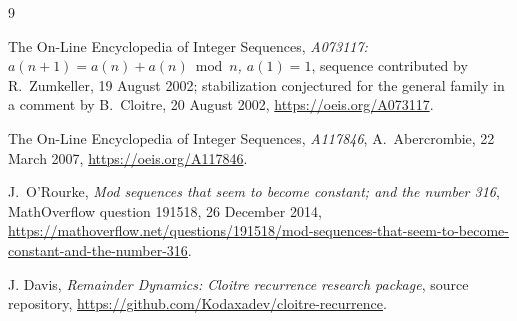 \documentclass[11pt]{article}
\theoremstyle{definition}
\theoremstyle{remark}
\begin{document}
\begin{thebibliography}{9}

The On-Line Encyclopedia of Integer Sequences,
\emph{A073117: $a(n+1)=a(n)+a(n)\bmod n$, $a(1)=1$},
sequence contributed by R.~Zumkeller, 19 August 2002;
stabilization conjectured for the general family in a comment by B.~Cloitre, 20 August 2002,
\url{https://oeis.org/A073117}.

The On-Line Encyclopedia of Integer Sequences,
\emph{A117846}, A.~Abercrombie, 22 March 2007,
\url{https://oeis.org/A117846}.

J.~O'Rourke,
\emph{Mod sequences that seem to become constant; and the number 316},
MathOverflow question 191518, 26 December 2014,
\url{https://mathoverflow.net/questions/191518/mod-sequences-that-seem-to-become-constant-and-the-number-316}.

J. Davis,
\emph{Remainder Dynamics: Cloitre recurrence research package},
source repository,
\url{https://github.com/Kodaxadev/cloitre-recurrence}.

\end{thebibliography}
\end{document}
